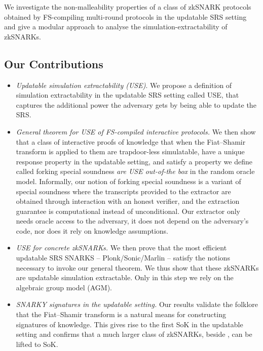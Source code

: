 We investigate the non-malleability properties of a class of zkSNARK protocols obtained by FS-compiling multi-round protocols in the updatable SRS setting and give a modular approach to analyse the simulation-extractability of zkSNARKs.
\subsection{Our Contributions}
\begin{itemize}
\item 
\emph{Updatable simulation extractability (USE)}. 
We propose a definition of simulation extractability in the updatable SRS setting called USE, that captures the additional power the adversary gets by being able to update the SRS.%
    
  \item \emph{General theorem for USE of FS-compiled interactive protocols.} We
        then show that a class of interactive proofs of knowledge that when
        the Fiat--Shamir transform is applied to them are trapdoor-less simulatable, have a
        unique response property in the updatable setting, and satisfy a
        property we define called forking special soundness \emph{are USE
        out-of-the box} in the random oracle model. Informally, our notion of forking
        special soundness is a variant of special soundness where the
        transcripts provided to the extractor are obtained through interaction
        with an honest verifier, and the extraction guarantee is computational
        instead of unconditional. Our extractor only needs oracle access to the
        adversary, it does not depend on the adversary’s code, nor does it rely on
        knowledge assumptions.
    
\item
\emph{USE for concrete zkSNARKs.}
We then prove that the most efficient updatable SRS SNARKS -- Plonk/Sonic/Marlin -- satisfy the notions necessary to invoke our general theorem. We thus show that these zkSNARKs are updatable simulation extractable.
Only in this step we rely on the algebraic group model (AGM).

\item
  \emph{SNARKY signatures in the updatable setting.} Our results validate the folklore that the Fiat--Shamir transform is a natural means for constructing signatures of knowledge. This gives rise to the first SoK in the updatable setting and confirms that a much larger class of zkSNARKs, beside \cite{C:GroMal17}, can be lifted to SoK.
	
\end{itemize}



